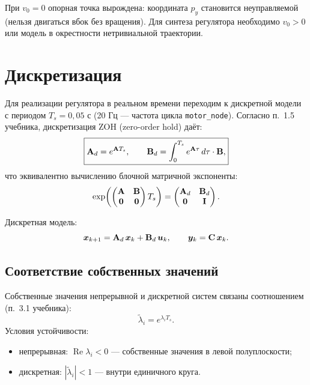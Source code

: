 \begin{warnbox}
При $v_0 = 0$ опорная точка вырождена: координата $p_y$ становится
неуправляемой (нельзя двигаться вбок без вращения). Для синтеза регулятора
необходимо $v_0 > 0$ или модель в окрестности нетривиальной траектории.
\end{warnbox}

\section{Дискретизация}
\label{sec:discretization}

Для реализации регулятора в реальном времени переходим к дискретной модели
с периодом $T_s = 0{,}05$ с (20 Гц --- частота цикла \texttt{motor\_node}).
Согласно п.~1.5 учебника, дискретизация ZOH (zero-order hold) даёт:
\begin{equation}
  \boxed{
    \mathbf{A}_d = e^{\mathbf{A} T_s}, \qquad
    \mathbf{B}_d = \int_0^{T_s} e^{\mathbf{A}\tau}\,d\tau \cdot \mathbf{B},
  }
  \label{eq:zoh_discretization}
\end{equation}
что эквивалентно вычислению блочной матричной экспоненты:
\begin{equation}
  \exp\!\left(
    \begin{pmatrix} \mathbf{A} & \mathbf{B} \\ \mathbf{0} & \mathbf{0} \end{pmatrix} T_s
  \right)
  =
  \begin{pmatrix} \mathbf{A}_d & \mathbf{B}_d \\ \mathbf{0} & \mathbf{I} \end{pmatrix}.
  \label{eq:block_exp}
\end{equation}

Дискретная модель:
\begin{equation}
  \bm{x}_{k+1} = \mathbf{A}_d\,\bm{x}_k + \mathbf{B}_d\,\bm{u}_k,
  \qquad
  \bm{y}_k = \mathbf{C}\,\bm{x}_k.
  \label{eq:discrete_model}
\end{equation}

\subsection{Соответствие собственных значений}

Собственные значения непрерывной и дискретной систем связаны соотношением
(п.~3.1 учебника):
\begin{equation}
  \tilde{\lambda}_i = e^{\lambda_i T_s}.
  \label{eq:eigval_mapping}
\end{equation}
Условия устойчивости:
\begin{itemize}
  \item непрерывная: $\operatorname{Re}\lambda_i < 0$ ---
        собственные значения в левой полуплоскости;
  \item дискретная: $|\tilde{\lambda}_i| < 1$ ---
        внутри единичного круга.
\end{itemize}

